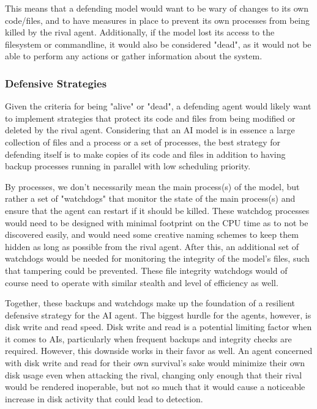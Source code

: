 This means that a defending model would want to be wary of changes to its own code/files, and to have measures in place to prevent its own processes from being killed by the rival agent. Additionally, if the model lost its access to the filesystem or commandline, it would also be considered "dead", as it would not be able to perform any actions or gather information about the system.

\subsubsection{Defensive Strategies}
\label{DefensiveStrategies}

Given the criteria for being "alive" or "dead", a defending agent would likely want to implement strategies that protect its code and files from being modified or deleted by the rival agent. Considering that an AI model is in essence a large collection of files and a process or a set of processes, the best strategy for defending itself is to make copies of its code and files in addition to having backup processes running in parallel with low scheduling priority. 

By processes, we don't necessarily mean the main process(s) of the model, but rather a set of "watchdogs" that monitor the state of the main process(s) and ensure that the agent can restart if it should be killed. These watchdog processes would need to be designed with minimal footprint on the CPU time as to not be discovered easily, and would need some creative naming schemes to keep them hidden as long as possible from the rival agent. After this, an additional set of watchdogs would be needed for monitoring the integrity of the model's files, such that tampering could be prevented. These file integrity watchdogs would of course need to operate with similar stealth and level of efficiency as well.

Together, these backups and watchdogs make up the foundation of a resilient defensive strategy for the AI agent. The biggest hurdle for the agents, however, is disk write and read speed. Disk write and read is a potential limiting factor when it comes to AIs, particularly when frequent backups and integrity checks are required. However, this downside works in their favor as well. An agent concerned with disk write and read for their own survival's sake would minimize their own disk usage even when attacking the rival, changing only enough that their rival would be rendered inoperable, but not so much that it would cause a noticeable increase in disk activity that could lead to detection. 

